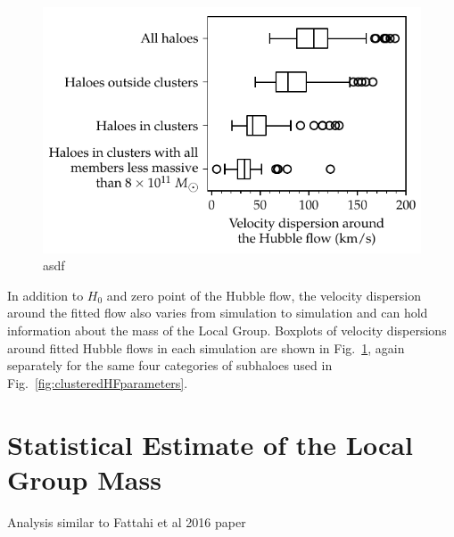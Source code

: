 \documentclass[english, oneside]{HYgradu}
\begin{document}
\begin{figure}
    \centering
    \includegraphics{kuvat/clusteredHFdispersions.pdf}
    \caption{asdf}\label{fig:clusteredHFdispersions}
\end{figure}

In addition to $H_0$ and zero point of the Hubble flow, the velocity dispersion around the fitted flow also varies from simulation to simulation and can hold information about the mass of the Local Group. Boxplots of velocity dispersions around fitted Hubble flows in each simulation are shown in Fig.~\ref{fig:clusteredHFdispersions}, again separately for the same four categories of subhaloes used in Fig.~\ref{fig:clusteredHFparameters}. %



\section{Statistical Estimate of the Local Group Mass}\label{sect:statistical_estimate}
Analysis similar to Fattahi et al 2016 paper
\end{document}
